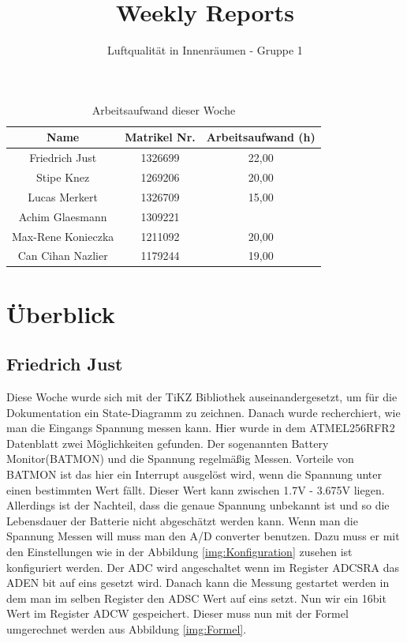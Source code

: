 \documentclass[]{article}
\title{Weekly Reports}
\author{Luftqualität in Innenräumen - Gruppe 1}
\begin{document}
\maketitle

\begin{table}[h!]
	\centering
	\begin{tabular}{|c|c|c|}
		\hline
		{\textbf{Name}}				&		{\textbf{Matrikel Nr.}} & {\textbf{Arbeitsaufwand (h)}} \\
		\hline
		Friedrich Just				&		1326699 				&		22,00\\
		\hline
		Stipe Knez					&		1269206 				&	20,00	\\
		\hline
		Lucas Merkert				&		1326709					&	15,00	\\
		\hline
		Achim Glaesmann				&		1309221					&		\\
		\hline
		Max-Rene Konieczka			&		1211092					&	20,00	\\
		\hline
		Can Cihan Nazlier			&		1179244					&	19,00	\\
		\hline
	\end{tabular}
	\caption{Arbeitsaufwand dieser Woche}
	\label{tab:worakload}
\end{table}



\section{Überblick}


\subsection{Friedrich Just}

Diese Woche wurde sich mit der TiKZ Bibliothek auseinandergesetzt, um für die Dokumentation ein State-Diagramm zu zeichnen. Danach wurde recherchiert, wie man die Eingangs Spannung messen kann. Hier wurde in dem ATMEL256RFR2 Datenblatt\cite{ATmegaDatasheet} zwei Möglichkeiten gefunden. Der sogenannten Battery Monitor(BATMON) und die Spannung regelmäßig Messen. Vorteile von BATMON ist das hier ein Interrupt ausgelöst wird, wenn die Spannung unter einen bestimmten Wert fällt. Dieser Wert kann zwischen 1.7V - 3.675V liegen. Allerdings ist der Nachteil, dass die genaue Spannung unbekannt ist und so die Lebensdauer der Batterie nicht abgeschätzt werden kann. Wenn man die Spannung Messen will muss man den A/D converter benutzen. Dazu muss er mit den Einstellungen wie in der Abbildung \ref{img:Konfiguration} zusehen ist konfiguriert werden. Der ADC wird angeschaltet wenn im Register ADCSRA das ADEN bit auf eins gesetzt wird. Danach kann die Messung gestartet werden in dem man im selben Register den ADSC Wert auf eins setzt. Nun wir ein 16bit Wert im Register ADCW gespeichert. Dieser muss nun mit der Formel umgerechnet werden aus Abbildung  \ref{img:Formel}.
\end{document}
